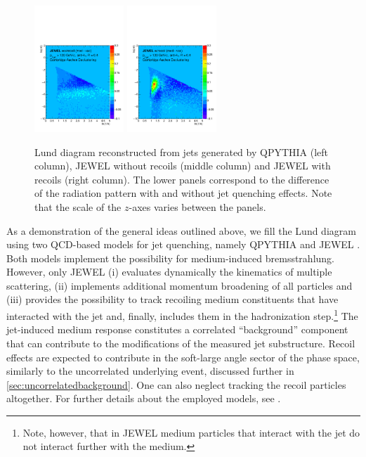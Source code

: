\begin{figure}[h]
\includegraphics[width=0.3\textwidth]{figures/LundMC/FinalPlots/Jewel_Diff_RecoilOff.pdf}
\includegraphics[width=0.3\textwidth]{figures/LundMC/FinalPlots/Jewel_Diff_RecoilOn.pdf}
\caption{Lund diagram reconstructed from jets generated by QPYTHIA (left column), JEWEL without recoils (middle column) and JEWEL with recoils (right column).
The lower panels correspond to the difference of the radiation pattern with and without jet quenching effects. Note that the scale of the $z$-axes varies between the panels.}
\label{fig:PS2}
\end{figure}
As a demonstration of the general ideas outlined above, we fill the Lund diagram using 
two QCD-based models for jet quenching, namely QPYTHIA \cite{Armesto:2009fj} and JEWEL \cite{Zapp:2011ya,Zapp:2012ak}. 
Both models implement the possibility for medium-induced bremsstrahlung. However, only JEWEL (i) evaluates dynamically the kinematics of multiple scattering, (ii) implements additional momentum broadening of all particles and (iii) provides the possibility to track recoiling medium constituents that have interacted with the jet and, finally, includes them in the hadronization step.\footnote{Note, however, that in JEWEL medium particles that interact with the jet do not interact further with the medium.} 
The jet-induced medium response constitutes a correlated ``background'' component that can contribute to the modifications of the measured jet substructure. Recoil effects are expected to contribute in the soft-large angle sector of the phase space, similarly to the uncorrelated underlying event, discussed further in \autoref{sec:uncorrelatedbackground}.
One can also neglect tracking the recoil particles altogether.
For further details about the employed models, see .

